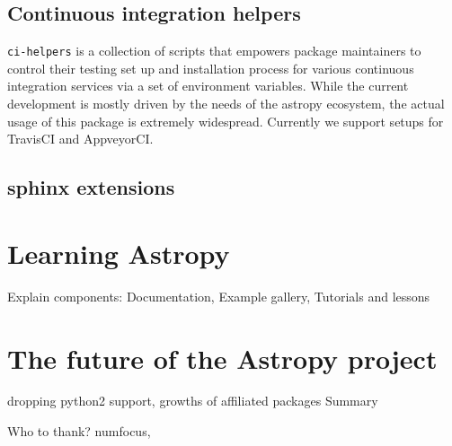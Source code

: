 \documentclass[modern]{aastex61}
\begin{document}
\subsection{Continuous integration helpers}
\texttt{ci-helpers} is a collection of scripts that empowers package
maintainers to control their testing set up and installation process for
various continuous integration services via a set of environment
variables. While the current development is mostly driven by the needs of
the astropy ecosystem, the actual usage of this package is extremely
widespread. Currently we support setups for TravisCI and AppveyorCI.
%
\subsection{sphinx extensions}



\section{Learning Astropy}
\label{sec:learning}

Explain components: Documentation, Example gallery, Tutorials and lessons

\section{The future of the Astropy project}
\label{sec:future}

dropping python2 support, growths of affiliated packages
Summary

\acknowledgments

Who to thank?  numfocus,






\begin{thebibliography}{}

\end{thebibliography}
\end{document}
